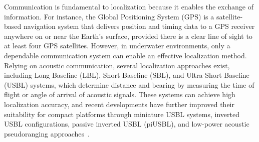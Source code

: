 \documentclass[subscriptcorrection,upint,varvw,barcolor=Goldenrod3,mathalfa=cal=euler,balance,hyphenate,pdf-a]{asmejour}
\begin{document}
Communication is fundamental to localization because it enables the exchange of information. For instance, the Global Positioning System (GPS) is a satellite-based navigation system that delivers position and timing data to a GPS receiver anywhere on or near the Earth's surface, provided there is a clear line of sight to at least four GPS satellites. However, in underwater environments, only a dependable communication system can enable an effective localization method. Relying on acoustic communication, several localization approaches exist, including Long Baseline (LBL), Short Baseline (SBL), and Ultra-Short Baseline (USBL) systems, which determine distance and bearing by measuring the time of flight or angle of arrival of acoustic signals. These systems can achieve high localization accuracy, and recent developments have further improved their suitability for compact platforms through miniature USBL systems, inverted USBL configurations, passive inverted USBL (piUSBL), and low-power acoustic pseudoranging approaches~\cite{Luo2021Review,Rypkema2019piUSBL,Wang2022PassiveIUSBL,Hinduja2022MEMSAcoustic}.
\end{document}
